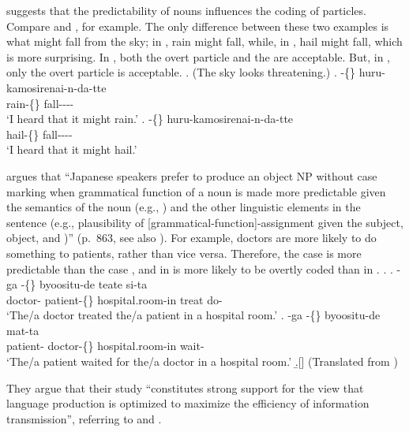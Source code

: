  suggests that
the predictability of nouns influences the coding of particles.
Compare \Next[a] and \Next[b], for example.
The only difference between these two examples is what
might fall from the sky;
in \Next[a], rain might fall,
while, in \Next[b], hail might fall,
which is more surprising.
In \Next[a], both the overt particle  and the 
are acceptable.
But, in \Next[b], only the overt particle is acceptable.
%
\ex. (The sky looks threatening.)
 \ag. -\{\} huru-kamosirenai-n-da-tte \\
      rain-\{\} fall---- \\
      `I heard that it might rain.'
 \bg. -\{\} huru-kamosirenai-n-da-tte \\
      hail-\{\} fall---- \\
      `I heard that it might hail.'
      \hfill{\cite[290]{niwa06}}

 argues that
``Japanese speakers prefer to produce an object NP without case marking
when grammatical function of a noun is made more predictable
given the semantics of the noun (e.g., ) and
the other linguistic elements in the sentence
(e.g., plausibility of [grammatical-function]-assignment given the subject, object, and )'' (p.~863, see also ).
For example,
doctors are more likely to do something to patients,
rather than vice versa.
Therefore, the case \Next[a] is more predictable than the case \Next[b],
and  in \Next[b] is more likely to be overtly coded than
 in \Next[a].
%
\ex.
 \ag. -ga -\{\} byoositu-de teate si-ta \\
      doctor- patient-\{\} hospital.room-in treat do- \\
      `The/a doctor treated the/a patient in a hospital room.'
 \bg. -ga -\{\} byoositu-de mat-ta \\
      patient- doctor-\{\} hospital.room-in wait- \\
      `The/a patient waited for the/a doctor in a hospital room.'
  \b.[]    \hfill{(Translated from )}

They argue that their study
``constitutes strong support for the view that
language production is optimized to maximize the efficiency of information transmission'',
referring to  and .

